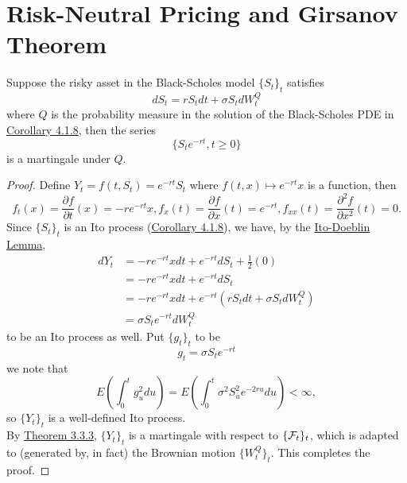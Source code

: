 \documentclass[11pt,fleqn]{book} %
\begin{document}

\section{Risk-Neutral Pricing and Girsanov Theorem}

\begin{proposition} \label{prop:421}
Suppose the risky asset in the Black-Scholes model \(\{S_t\}_t\) satisfies
\[
dS_t = rS_tdt + \sigma S_tdW_t^Q
\]
where \(Q\) is the probability measure in the solution of the Black-Scholes PDE in \hyperref[cor:418]{Corollary 4.1.8}, then the series
\[
\{S_te^{-rt}, t \geq 0\}
\]
is a martingale under \(Q\).
\end{proposition}
\begin{proof}
Define \(Y_t = f(t, S_t) = e^{-rt}S_t\) where \(f(t, x) \mapsto e^{-rt}x\) is a function, then
\[
f_t(x) = \frac{\partial f}{\partial t}(x) = -re^{-rt}x, f_x(t) = \frac{\partial f}{\partial x}(t) = e^{-rt}, f_{xx}(t) = \frac{\partial^2 f}{\partial x^2}(t) = 0.
\]
\indent Since \(\{S_t\}_t\) is an Ito process (\hyperref[cor:418]{Corollary 4.1.8}), we have, by the \hyperref[thm:339]{Ito-Doeblin Lemma},
\[
\begin{aligned}
dY_t &= -re^{-rt}xdt + e^{-rt}dS_t + \frac12(0) \\
&= -re^{-rt}xdt + e^{-rt}dS_t \\
&= -re^{-rt}xdt + e^{-rt}(rS_tdt + \sigma S_tdW_t^Q) \\
&= \sigma S_te^{-rt}dW_t^Q
\end{aligned}
\]
to be an Ito process as well. Put \(\{g_t\}_t\) to be
\[
g_t = \sigma S_te^{-rt}
\]
we note that
\[
E\left(\int_0^t g_u^2du\right) = E\left(\int_0^t\sigma^2S_u^2e^{-2ru}du\right) < \infty,
\]
so \(\{Y_t\}_t\) is a well-defined Ito process. \\
\indent By \hyperref[thm:333]{Theorem 3.3.3}, \(\{Y_t\}_t\) is a martingale with respect to \(\{\mathcal{F}_t\}_t\), which is adapted to (generated by, in fact) the Brownian motion \(\{W_t^Q\}_t\). This completes the proof.
\end{proof}
\end{document}

